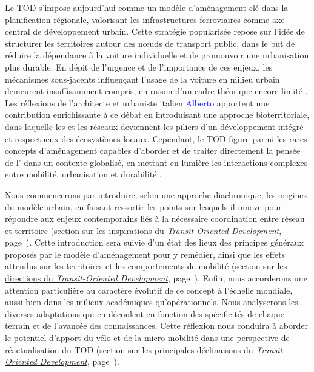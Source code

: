 \begin{refsegment}
Le \acrshort{TOD} s’impose aujourd’hui comme un modèle d’aménagement clé dans la planification régionale, valorisant les infrastructures ferroviaires comme axe central de développement urbain. Cette stratégie popularisée repose sur l’idée de structurer les territoires autour des nœuds de transport public, dans le but de réduire la dépendance à la voiture individuelle et de promouvoir une urbanisation plus durable. En dépit de l’urgence et de l’importance de ces enjeux, les mécanismes sous-jacents influençant l’usage de la voiture en milieu urbain demeurent insuffisamment compris, en raison d’un cadre théorique encore limité \textcolor{blue}{\autocite[1]{verbavatz_critical_2019}}. Les réflexions de l’architecte et urbaniste italien \textcolor{blue}{Alberto} \textcolor{blue}{\textcite[]{magnaghi_bioregion_2014}} apportent une contribution enrichissante à ce débat en introduisant une approche bioterritoriale, dans laquelle les  et les réseaux deviennent les piliers d’un développement intégré et respectueux des écosystèmes locaux. Cependant, le \acrshort{TOD} figure parmi les rares concepts d’aménagement capables d’aborder et de traiter directement la pensée de l’ \textcolor{blue}{\autocite[]{dupuy_urbanisme_1991}} dans un contexte globalisé, en mettant en lumière les interactions complexes entre mobilité, urbanisation et durabilité \textcolor{blue}{\autocite[51]{el_hadeuf_ville_2017}}.%

Nous commencerons par introduire, selon une approche diachronique, les origines du modèle urbain, en faisant ressortir les points sur lesquels il innove pour répondre aux enjeux contemporains liés à la nécessaire coordination entre réseau et territoire (\hyperref[chap1:tod-presentation-generale-origines]{section sur les inspirations du \textsl{Transit-Oriented Development}}, page~\pageref{chap1:tod-presentation-generale-origines}). Cette introduction sera suivie d’un état des lieux des principes généraux proposés par le modèle d’aménagement pour y remédier, ainsi que les effets attendus sur les territoires et les comportements de mobilité (\hyperref[chap1:tod-presentation-generale-definition]{section sur les directions du \textsl{Transit-Oriented Development}}, page~\pageref{chap1:tod-presentation-generale-definition}). Enfin, nous accorderons une attention particulière au caractère évolutif de ce concept à l’échelle mondiale, aussi bien dans les milieux académiques qu’opérationnels. Nous analyserons les diverses adaptations qui en découlent en fonction des spécificités de chaque terrain et de l'avancée des connaissances. Cette réflexion nous conduira à aborder le potentiel d’apport du vélo et de la \gls{micro-mobilité} dans une perspective de réactualisation du \acrshort{TOD} (\hyperref[chap1:tod-presentation-generale-declinaisons]{section sur les principales déclinaisons du \textsl{Transit-Oriented Development}}, page~\pageref{chap1:tod-presentation-generale-declinaisons}).%


\end{refsegment}
